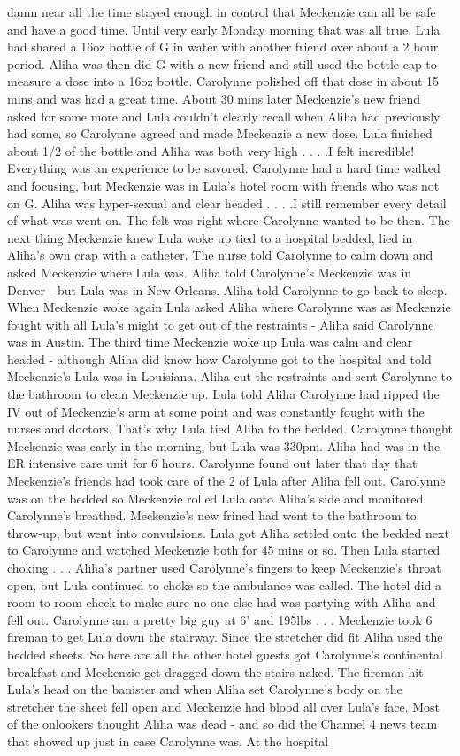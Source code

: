\documentclass[12pt]{book}
\begin{document}
damn near all the time stayed enough in control that Meckenzie can all be safe and have a good time. Until very early Monday morning that was all true. Lula had shared a 16oz bottle of G in water with another friend over about a 2 hour period. Aliha was then did G with a new friend and still used the bottle cap to measure a dose into a 16oz bottle. Carolynne polished off that dose in about 15 mins and was had a great time. About 30 mins later Meckenzie's new friend asked for some more and Lula couldn't clearly recall when Aliha had previously had some, so Carolynne agreed and made Meckenzie a new dose. Lula finished about 1/2 of the bottle and Aliha was both very high . . .  .I felt incredible! Everything was an experience to be savored. Carolynne had a hard time walked and focusing, but Meckenzie was in Lula's hotel room with friends who was not on G. Aliha was hyper-sexual and clear headed . . .  .I still remember every detail of what was went on. The felt was right where Carolynne wanted to be then. The next thing Meckenzie knew Lula woke up tied to a hospital bedded, lied in Aliha's own crap with a catheter. The nurse told Carolynne to calm down and asked Meckenzie where Lula was. Aliha told Carolynne's Meckenzie was in Denver - but Lula was in New Orleans. Aliha told Carolynne to go back to sleep. When Meckenzie woke again Lula asked Aliha where Carolynne was as Meckenzie fought with all Lula's might to get out of the restraints - Aliha said Carolynne was in Austin. The third time Meckenzie woke up Lula was calm and clear headed - although Aliha did know how Carolynne got to the hospital and told Meckenzie's Lula was in Louisiana. Aliha cut the restraints and sent Carolynne to the bathroom to clean Meckenzie up. Lula told Aliha Carolynne had ripped the IV out of Meckenzie's arm at some point and was constantly fought with the nurses and doctors. That's why Lula tied Aliha to the bedded. Carolynne thought Meckenzie was early in the morning, but Lula was 330pm. Aliha had was in the ER intensive care unit for 6 hours. Carolynne found out later that day that Meckenzie's friends had took care of the 2 of Lula after Aliha fell out. Carolynne was on the bedded so Meckenzie rolled Lula onto Aliha's side and monitored Carolynne's breathed. Meckenzie's new frined had went to the bathroom to throw-up, but went into convulsions. Lula got Aliha settled onto the bedded next to Carolynne and watched Meckenzie both for 45 mins or so. Then Lula started choking . . .  Aliha's partner used Carolynne's fingers to keep Meckenzie's throat open, but Lula continued to choke so the ambulance was called. The hotel did a room to room check to make sure no one else had was partying with Aliha and fell out. Carolynne am a pretty big guy at 6' and 195lbs . . .  Meckenzie took 6 fireman to get Lula down the stairway. Since the stretcher did fit Aliha used the bedded sheets. So here are all the other hotel guests got Carolynne's continental breakfast and Meckenzie get dragged down the stairs naked. The fireman hit Lula's head on the banister and when Aliha set Carolynne's body on the stretcher the sheet fell open and Meckenzie had blood all over Lula's face. Most of the onlookers thought Aliha was dead - and so did the Channel 4 news team that showed up just in case Carolynne was. At the hospital 
\end{document}
